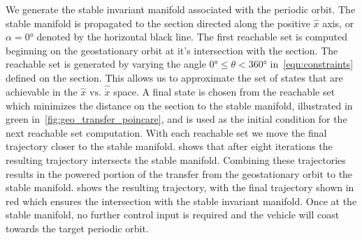 \documentclass[preprint]{elsarticle}
\begin{document}
We generate the stable invariant manifold associated with the periodic orbit.
The stable manifold is propagated to the \Poincare section directed along the positive \( \hat{x} \) axis, or \( \alpha =\ang{0} \) denoted by the horizontal black line.
The first reachable set is computed beginning on the geostationary orbit at it's intersection with the \Poincare section.
The reachable set is generated by varying the angle \( \ang{0} \leq \theta < \ang{360} \) in~\cref{eqn:constraints} defined on the \Poincare section.
This allows us to approximate the set of states that are achievable in the \( \hat{x} \text{ vs. } \hat{\dot{x}} \) space.
A final state is chosen from the reachable set which minimizes the distance on the \Poincare section to the stable manifold, illustrated in green in~\cref{fig:geo_transfer_poincare}, and is used as the initial condition for the next reachable set computation.
With each reachable set we move the final trajectory closer to the stable manifold.
 shows that after eight iterations the resulting trajectory intersects the stable manifold. 
Combining these trajectories results in the powered portion of the transfer from the geostationary orbit to the stable manifold. 
 shows the resulting trajectory, with the final trajectory shown in red which ensures the intersection with the stable invariant manifold.
Once at the stable manifold, no further control input is required and the vehicle will coast towards the target periodic orbit.
\end{document}

